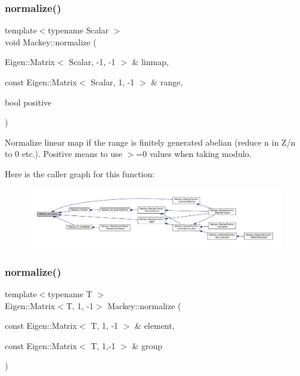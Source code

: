 \mbox{\label{namespaceMackey_a5a3367c31144a61006d7c605d6e6ca38}} 
\subsubsection{\texorpdfstring{normalize()}{normalize()}\hspace{0.1cm}{\footnotesize\ttfamily [1/2]}}
{\footnotesize\ttfamily template$<$typename Scalar $>$ \\
void Mackey\+::normalize (\begin{DoxyParamCaption}\item[{Eigen\+::\+Matrix$<$ Scalar, -\/1, -\/1 $>$ \&}]{linmap,  }\item[{const Eigen\+::\+Matrix$<$ Scalar, 1, -\/1 $>$ \&}]{range,  }\item[{bool}]{positive }\end{DoxyParamCaption})}



Normalize linear map if the range is finitely generated abelian (reduce n in Z/n to 0 etc.). Positive means to use $>$=0 values when taking modulo. 

Here is the caller graph for this function\+:\nopagebreak
\begin{figure}[H]
\begin{center}
\leavevmode
\includegraphics[width=350pt]{namespaceMackey_a5a3367c31144a61006d7c605d6e6ca38_icgraph}
\end{center}
\end{figure}
\mbox{\label{namespaceMackey_aa3ee3f5d387e24122f0e2865f742675f}} 
\subsubsection{\texorpdfstring{normalize()}{normalize()}\hspace{0.1cm}{\footnotesize\ttfamily [2/2]}}
{\footnotesize\ttfamily template$<$typename T $>$ \\
Eigen\+::\+Matrix$<$T, 1, -\/1$>$ Mackey\+::normalize (\begin{DoxyParamCaption}\item[{const Eigen\+::\+Matrix$<$ T, 1, -\/1 $>$ \&}]{element,  }\item[{const Eigen\+::\+Matrix$<$ T, 1,-\/1 $>$ \&}]{group }\end{DoxyParamCaption})}



